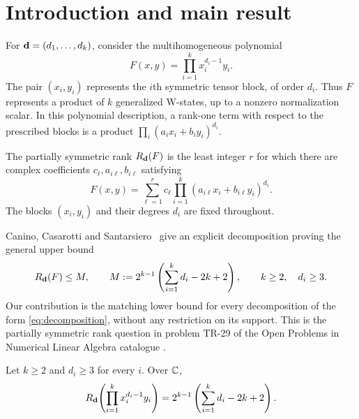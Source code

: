 \section{Introduction and main result}\label{sec:intro}

For $\mathbf d=(d_1,\ldots,d_k)$, consider the multihomogeneous polynomial
\begin{equation}\label{eq:target}
F(x,y)=\prod_{i=1}^k x_i^{d_i-1}y_i.
\end{equation}
The pair $(x_i,y_i)$ represents the $i$th symmetric tensor block, of order
$d_i$. Thus $F$ represents a product of $k$ generalized W-states, up to a
nonzero normalization scalar. In this polynomial description, a rank-one
term with respect to the prescribed blocks is a product
$\prod_i(a_i x_i+b_i y_i)^{d_i}$.

\begin{definition}
The partially symmetric rank $R_{\mathbf d}(F)$ is the least integer $r$ for which
there are complex coefficients $c_\ell,a_{i\ell},b_{i\ell}$ satisfying
\begin{equation}\label{eq:decomposition}
F(x,y)=\sum_{\ell=1}^r c_\ell
\prod_{i=1}^k(a_{i\ell}x_i+b_{i\ell}y_i)^{d_i}.
\end{equation}
The blocks $(x_i,y_i)$ and their degrees $d_i$ are fixed throughout.
\end{definition}

Canino, Casarotti and Santarsiero~\cite[Theorem~1.1]{CCS2025} give an
explicit decomposition proving the general upper bound
\begin{equation}\label{eq:upper}
R_{\mathbf d}(F)\le M,
\qquad M:=2^{k-1}\left(\sum_{i=1}^k d_i-2k+2\right),
\qquad k\ge2,\quad d_i\ge3.
\end{equation}
Our contribution is the matching lower bound for every decomposition
of the form \eqref{eq:decomposition}, without any restriction on its
support. This is the partially symmetric rank question in problem
TR-29 of the Open Problems in Numerical Linear Algebra catalogue
\cite{TR29}.

\begin{theorem}\label{thm:main}
Let $k\ge2$ and $d_i\ge3$ for every $i$. Over $\mathbb C$,
\begin{equation}\label{eq:main}
R_{\mathbf d}\!\left(\prod_{i=1}^k x_i^{d_i-1}y_i\right)
=2^{k-1}\left(\sum_{i=1}^k d_i-2k+2\right).
\end{equation}
\end{theorem}

